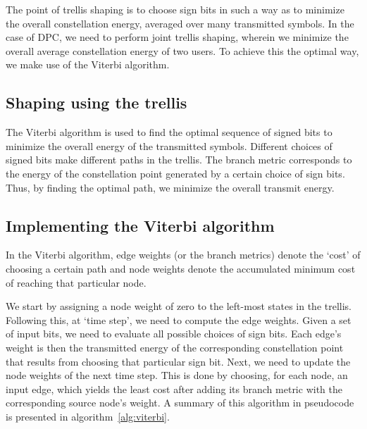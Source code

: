 The point of trellis shaping is to choose sign bits in such a way as to
minimize the overall constellation energy, averaged over many transmitted
symbols. In the case of DPC, we need to perform joint trellis shaping, wherein
we minimize the overall average constellation energy of two users. To achieve
this the optimal way, we make use of the Viterbi algorithm.

\subsection{Shaping using the trellis}

The Viterbi algorithm \citep{Viterbi1967} is used to find the optimal sequence
of signed bits to minimize the overall energy of the transmitted symbols.
Different choices of signed bits make different paths in the trellis. The
branch metric corresponds to the energy of the constellation point generated by
a certain choice of sign bits. Thus, by finding the optimal path, we minimize
the overall transmit energy.

\subsection{Implementing the Viterbi algorithm}

In the Viterbi algorithm, edge weights (or the branch metrics) denote the
`cost' of choosing a certain path and node weights denote the accumulated
minimum cost of reaching that particular node.

We start by assigning a node weight of zero to the left-most states in the
trellis. Following this, at `time step', we need to compute the edge weights.
Given a set of input bits, we need to evaluate all possible choices of sign
bits. Each edge's weight is then the transmitted energy of the corresponding
constellation point that results from choosing that particular sign bit. Next,
we need to update the node weights of the next time step. This is done by
choosing, for each node, an input edge, which yields the least cost after
adding its branch metric with the corresponding source node's weight. A summary
of this algorithm in pseudocode is presented in algorithm~\ref{alg:viterbi}.

